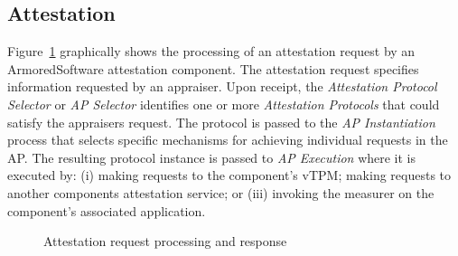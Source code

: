 \documentclass[10pt]{article}
\begin{document}
\subsection{Attestation}

Figure~\ref{fig:attestation} graphically shows the processing of an
attestation request by an ArmoredSoftware attestation component.  The
attestation request specifies information requested by an appraiser.
Upon receipt, the \emph{Attestation Protocol Selector} or \emph{AP
  Selector} identifies one or more \emph{Attestation Protocols} that
could satisfy the appraisers request.  The protocol is passed to the
\emph{AP Instantiation} process that selects specific mechanisms for
achieving individual requests in the AP.  The resulting protocol
instance is passed to \emph{AP Execution} where it is executed by: (i)
making requests to the component's vTPM; making requests to another
components attestation service; or (iii) invoking the measurer on the
component's associated application.

\begin{figure}
\centering 
{}
  \caption{Attestation request processing and response}
  \label{fig:attestation}
\end{figure}
\end{document}

